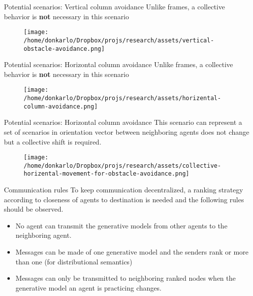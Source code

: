 \documentclass[unknownkeysallowed]{beamer}
\begin{document}
	\begin{frame}{Potential scenarios: Vertical column avoidance}
		Unlike frames, a collective behavior is \textbf{not} necessary in this scenario
		\begin{figure}
			\centering
			\texttt{[image: /home/donkarlo/Dropbox/projs/research/assets/vertical-obstacle-avoidance.png]}
			\label{fig:vertical-obstacle-avoidance}
		\end{figure}
	\end{frame}

	\begin{frame}{Potential scenarios: Horizontal column avoidance}
		Unlike frames, a collective behavior is \textbf{not} necessary in this scenario
		\begin{figure}
			\centering
			\texttt{[image: /home/donkarlo/Dropbox/projs/research/assets/horizental-column-avoidance.png]}
			\label{fig:vertical-obstacle-avoidance}
		\end{figure}
	\end{frame}

	\begin{frame}{Potential scenarios: Horizontal column avoidance}
		This scenario can represent a set of scenarios in orientation vector between neighboring agents does not change but a collective shift is required. 
		\begin{figure}
			\centering
			\texttt{[image: /home/donkarlo/Dropbox/projs/research/assets/collective-horizental-movement-for-obstacle-avoidance.png]}
			\label{fig:vertical-obstacle-avoidance}
		\end{figure}   
	\end{frame}

	\begin{frame}{Communication rules}
		To keep communication decentralized, a ranking strategy according to closeness of agents to destination is needed and the following rules should be observed. 
		\begin{itemize}
			\item No agent can transmit the generative models from other agents to the neighboring agent.
			\item Messages can be made of one generative model and the senders rank or more than one (for distributional semantics) 
			\item Messages can only be transmitted to neighboring ranked nodes when the generative model an agent is practicing changes.
		\end{itemize}
	\end{frame}
\end{document}

